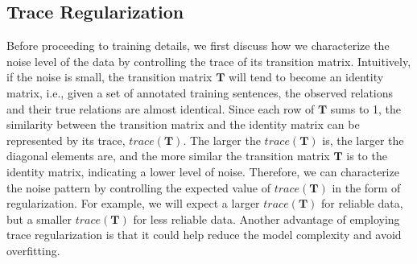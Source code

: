 
\subsection{Trace Regularization}
Before proceeding to training details, we first discuss how we characterize the noise level of the data by controlling the trace of its transition matrix.
Intuitively, if the noise is small, the transition matrix $\mathbf{T}$ will tend to become an identity matrix, i.e., given a set of annotated training sentences,  the observed relations and their true relations are almost identical. Since each row of $\mathbf{T}$ sums to 1, the similarity between the transition matrix and the identity matrix can be represented by its trace, $trace (\mathbf{T})$. The larger the $trace(\mathbf{T})$ is, the larger the diagonal elements are, and the more similar the transition matrix $\mathbf{T}$ is to the identity matrix, indicating a lower level of noise. Therefore, we can characterize  the noise pattern by controlling the expected value of $trace(\mathbf{T})$ in the form of regularization. For example, we will expect a larger $trace (\mathbf{T})$ for reliable data, but  a smaller $trace(\mathbf{T})$  for less reliable data. Another advantage of employing trace regularization is that it could help reduce the model complexity  %
and avoid overfitting.


